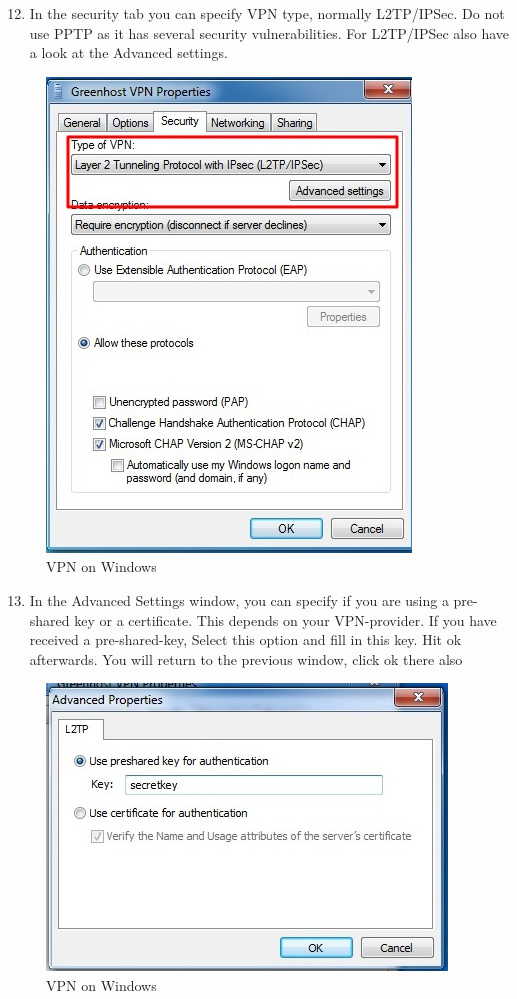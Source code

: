 \begin{enumerate}[1.]
\setcounter{enumi}{11}
\item
  In the security tab you can specify VPN type, normally L2TP/IPSec. Do
  not use PPTP as it has several security vulnerabilities. For
  L2TP/IPSec also have a look at the Advanced settings.
\end{enumerate}
\begin{figure}[htbp]
\centering
\includegraphics{vpn_windows_11.jpg}
\caption{VPN on Windows}
\end{figure}

\begin{enumerate}[1.]
\setcounter{enumi}{12}
\item
  In the Advanced Settings window, you can specify if you are using a
  pre-shared key or a certificate. This depends on your VPN-provider. If
  you have received a pre-shared-key, Select this option and fill in
  this key. Hit ok afterwards. You will return to the previous window,
  click ok there also
\end{enumerate}
\begin{figure}[htbp]
\centering
\includegraphics{vpn_windows_12.jpg}
\caption{VPN on Windows}
\end{figure}

